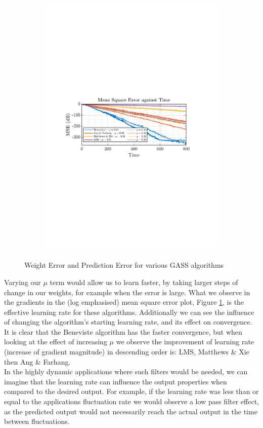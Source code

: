 \documentclass[12pt]{article}
\begin{document}
\begin{figure}[H]
\begin{subfigure}{0.49\textwidth}
					\centering
					\includegraphics[trim={2.2cm 11.2cm 3.15cm  11.2cm}, clip, width=\textwidth]{../MATLAB/figures/q2_2a_fig04.pdf} 
					\captionsetup{justification=centering}
				\end{subfigure}
				\captionsetup{justification=centering}
				\caption{Weight Error and Prediction Error for various GASS algorithms}
				\label{fig: 2-2a}
			\end{figure}
		Varying our $\mu$ term would allow us to learn faster, by taking larger steps of change in our weights, for example when the error is large. What we observe in the gradients in the (log emphasised) mean square error plot, Figure \ref{fig: 2-2a}, is the effective learning rate for these algorithms. Additionally we can see the influence of changing the algorithm's starting learning rate, and its effect on convergence. It is clear that the Beneviste algorithm has the faster convergence, but when looking at the effect of increasing $\mu$ we observe the improvement of learning rate (increase of gradient magnitude) in descending order is: LMS, Matthews \& Xie then Ang \& Farhang.\\
		In the highly dynamic applications where such filters would be needed, we can imagine that the learning rate can influence the output properties when compared to the desired output. For example, if the learning rate was less than or equal to the applications fluctuation rate we would observe a low pass filter effect, as the predicted output would not necessarily reach the actual output in the time between fluctuations.
		
\end{document}

